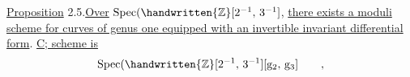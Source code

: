 \uline{Proposition} 2.5.\quad \uline{Over} $\operatorname{Spec}(\handwritten{\mathbb{Z}}[2^{-1},\,3^{-1}]$, \uline{there exists a moduli scheme for curves of genus one equipped with an invertible invariant differential form}. \uline{C; scheme is}
\[
\operatorname{Spec}(\handwritten{\mathbb{Z}}[2^{-1},\,3^{-1}][\mathrm{g}_{2},\,\mathrm{g}_{3}]\qquad,
\]
\clearpage
